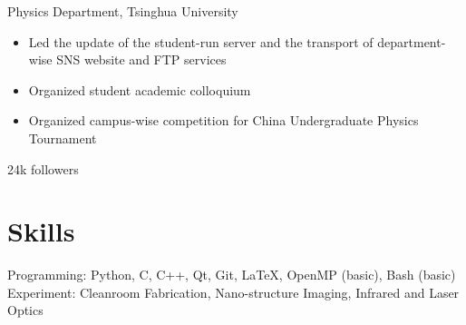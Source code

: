 \documentclass[11pt,letterpaper]{resume}
\begin{document}
Physics Department, Tsinghua University
\begin{itemize}
    \item Led the update of the student-run server and 
    the transport of department-wise SNS website and FTP services
    \item Organized student academic colloquium 
    \item Organized campus-wise competition for China Undergraduate Physics 
    Tournament
\end{itemize}\medskip

24k followers

\section{Skills}
Programming: Python, C, C++, Qt, Git, \LaTeX, OpenMP (basic), Bash (basic)\\
Experiment: Cleanroom Fabrication, Nano-structure Imaging, 
Infrared and Laser Optics
\end{document}
